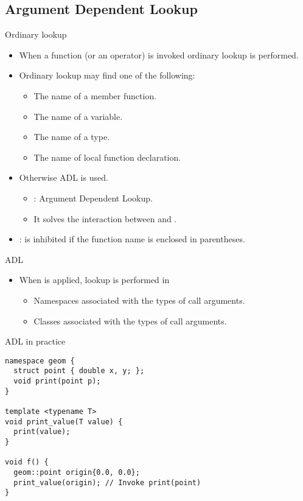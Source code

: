 \subsection{Argument Dependent Lookup}

\begin{frame}[t,fragile]{Ordinary lookup}
\begin{itemize}
  \item When a function (or an operator) is invoked ordinary lookup is performed.

  \item Ordinary lookup may find one of the following:
    \begin{itemize}
      \item The name of a member function.
      \item The name of a variable.
      \item The name of a type.
      \item The name of local function declaration.
    \end{itemize}

  \item Otherwise ADL is used.
    \begin{itemize}
      \item {}: Argument Dependent Lookup.
      \item It solves the interaction between 
             and .
    \end{itemize}

  \item {}:  is inhibited if the function name is
        enclosed in parentheses.
\end{itemize}
\end{frame}

\begin{frame}[t,fragile]{ADL}
\begin{itemize}
  \item When  is applied, lookup is performed in
    \begin{itemize}
      \item Namespaces associated with the types of call arguments.
      \item Classes associated with the types of call arguments.
    \end{itemize}
\end{itemize}

\begin{block}{ADL in practice}
\begin{lstlisting}[basicstyle=\tiny]
namespace geom {
  struct point { double x, y; };
  void print(point p);
}

template <typename T>
void print_value(T value) {
  print(value);
}

void f() {
  geom::point origin{0.0, 0.0};
  print_value(origin); // Invoke print(point)
}
\end{lstlisting}
\end{block}

\end{frame}


